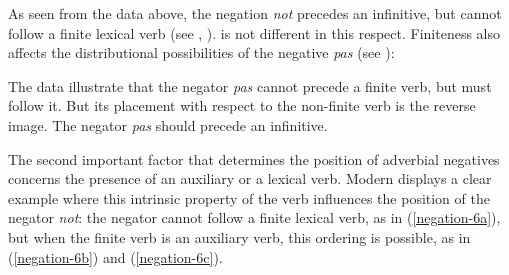 \documentclass[output=paper,biblatex,babelshorthands,newtxmath,draftmode,colorlinks,citecolor=brown]{langscibook}
\begin{document}
\begin{exe}
\ex\label{negation-eng-fin-neg} \begin{xlist}
\zl


\begin{exe}
\ex\label{negation-fr-fin-neg} \begin{xlist}
\zl
%
\noindent 
As seen from the data above, the negation \textit{not} precedes an infinitive, but cannot follow
a finite lexical  verb (see \citealt[Chapter~15]{Baker:89}, \citealt{Baker:91,Ernst:92}).
 is not different in this respect. Finiteness also affects the distributional
possibilities of the  negative \emph{pas} (see \citealt{AG:97, KS:02, Zeijlstra:15}): 

\eal
{}
\zl

\eal{}
\zl

\noindent
The data illustrate that the negator \textit{pas} cannot precede a finite verb,
but must follow it. But its placement with respect to
the non-finite verb is the reverse image. The negator \textit{pas}
should precede an infinitive.

\largerpage[-1]
The second important factor that determines the position of adverbial
negatives concerns the presence of an auxiliary or a lexical  verb.
Modern  displays a clear example where this
intrinsic property of the verb influences the position of
the  negator \textit{not}: the negator cannot follow
a finite lexical  verb, as in (\ref{negation-6a}), but when the finite verb is an auxiliary verb,
this ordering is possible, as in (\ref{negation-6b}) and (\ref{negation-6c}).


\end{xlist}
\end{exe}
\end{xlist}
\end{exe}
\end{document}

